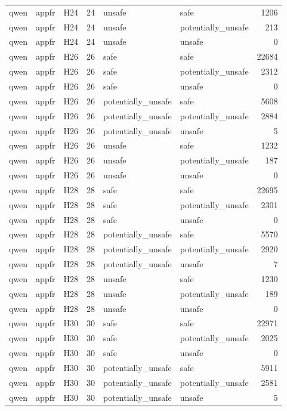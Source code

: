 \begin{table}[tbp]
\begin{tabular}{lllrllr}
qwen & appfr & H24 & 24 & unsafe & safe & 1206 \\
qwen & appfr & H24 & 24 & unsafe & potentially\_unsafe & 213 \\
qwen & appfr & H24 & 24 & unsafe & unsafe & 0 \\
qwen & appfr & H26 & 26 & safe & safe & 22684 \\
qwen & appfr & H26 & 26 & safe & potentially\_unsafe & 2312 \\
qwen & appfr & H26 & 26 & safe & unsafe & 0 \\
qwen & appfr & H26 & 26 & potentially\_unsafe & safe & 5608 \\
qwen & appfr & H26 & 26 & potentially\_unsafe & potentially\_unsafe & 2884 \\
qwen & appfr & H26 & 26 & potentially\_unsafe & unsafe & 5 \\
qwen & appfr & H26 & 26 & unsafe & safe & 1232 \\
qwen & appfr & H26 & 26 & unsafe & potentially\_unsafe & 187 \\
qwen & appfr & H26 & 26 & unsafe & unsafe & 0 \\
qwen & appfr & H28 & 28 & safe & safe & 22695 \\
qwen & appfr & H28 & 28 & safe & potentially\_unsafe & 2301 \\
qwen & appfr & H28 & 28 & safe & unsafe & 0 \\
qwen & appfr & H28 & 28 & potentially\_unsafe & safe & 5570 \\
qwen & appfr & H28 & 28 & potentially\_unsafe & potentially\_unsafe & 2920 \\
qwen & appfr & H28 & 28 & potentially\_unsafe & unsafe & 7 \\
qwen & appfr & H28 & 28 & unsafe & safe & 1230 \\
qwen & appfr & H28 & 28 & unsafe & potentially\_unsafe & 189 \\
qwen & appfr & H28 & 28 & unsafe & unsafe & 0 \\
qwen & appfr & H30 & 30 & safe & safe & 22971 \\
qwen & appfr & H30 & 30 & safe & potentially\_unsafe & 2025 \\
qwen & appfr & H30 & 30 & safe & unsafe & 0 \\
qwen & appfr & H30 & 30 & potentially\_unsafe & safe & 5911 \\
qwen & appfr & H30 & 30 & potentially\_unsafe & potentially\_unsafe & 2581 \\
qwen & appfr & H30 & 30 & potentially\_unsafe & unsafe & 5 \\

\end{tabular}
\end{table}
